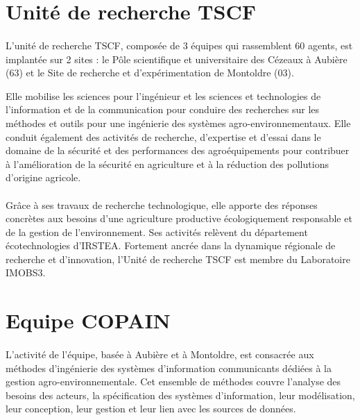 \section{Unité de recherche TSCF}
\paragraph{}
L’unité de recherche \gls{TSCF}, composée de 3 équipes qui rassemblent 60 agents, est implantée sur 2 sites : le Pôle scientifique et universitaire des Cézeaux à Aubière (63) et le Site de recherche et d’expérimentation de Montoldre (03). 

Elle mobilise les sciences pour l’ingénieur et les sciences et technologies de l’information et de la communication pour conduire des recherches sur les méthodes et outils pour une ingénierie des systèmes agro-environnementaux. 
\newline
Elle conduit également des activités de recherche, d’expertise et d’essai dans le domaine de la sécurité et des performances des agroéquipements pour contribuer à l’amélioration de la sécurité en agriculture et à la réduction des pollutions d’origine agricole. 
\paragraph{}
Grâce à ses travaux de recherche technologique, elle apporte des réponses concrètes aux besoins d’une agriculture productive écologiquement responsable et de la gestion de l’environnement. Ses activités relèvent du département écotechnologies d'IRSTEA. 
\newline
Fortement ancrée dans la dynamique régionale de recherche et d’innovation, l’Unité de recherche TSCF est membre du Laboratoire \gls{IMOBS3}. 

\section{Equipe \gls{COPAIN}}
\paragraph{}
L’activité de l’équipe, basée à Aubière et à Montoldre, est consacrée aux méthodes d’ingénierie des systèmes d’information communicants dédiées à la gestion agro-environnementale. Cet ensemble de méthodes couvre l’analyse des besoins des acteurs, la spécification des systèmes d’information, leur modélisation, leur conception, leur gestion et leur lien avec les sources de données. 
